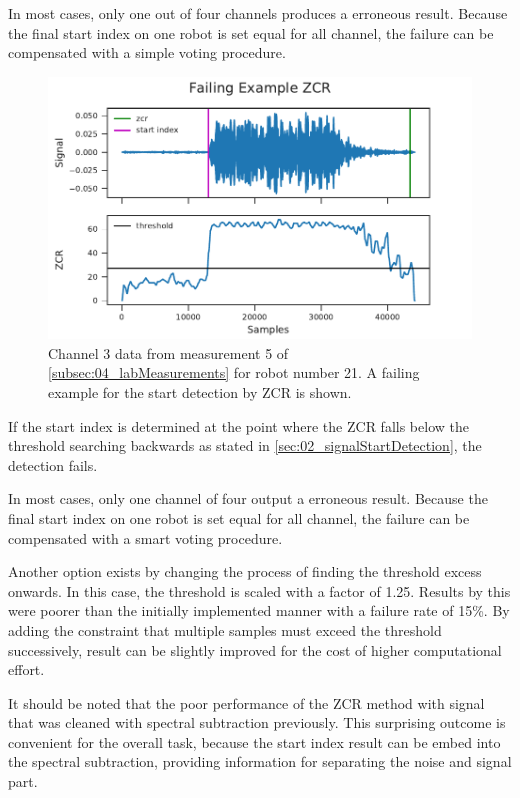 In most cases, only one out of four channels produces a erroneous
result.
Because the final start index on one robot is set equal for all channel,
the failure can be compensated with a simple voting procedure.
\begin{figure}[ht]
	\centering
	\includegraphics[]{figures/evaluation/zcr_fail}
	\caption{Channel 3 data from measurement 5 of \cref{subsec:04_labMeasurements}
		for robot number 21. A failing example for the start detection by \ac{ZCR}
		is shown.}
	\label{fig:04_zcrFail}
\end{figure}
If the start index is determined at the point where the \ac{ZCR}
falls below the threshold searching backwards as stated in \cref{sec:02_signalStartDetection},
the detection fails.

In most cases, only one channel of four output a erroneous result.
Because the final start index on one robot is set equal for all channel,
the failure can be compensated with a smart voting procedure.

Another option exists by changing the process of finding the
threshold excess onwards.
In this case, the threshold is scaled with a factor of 1.25.
Results by this were poorer than the initially implemented manner
with a failure rate of 15\si{\percent}.
By adding the constraint that multiple samples must exceed the
threshold successively, result can be slightly improved for the cost of higher
computational effort.

It should be noted that the poor performance of the \ac{ZCR} method with signal that
was cleaned with spectral subtraction previously. This surprising outcome is
convenient for the overall task, because the start index result can be embed
into the spectral subtraction, providing information for separating the noise
and signal part.

